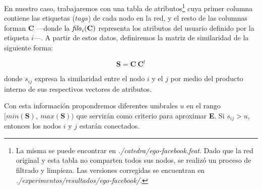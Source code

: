 
\vspace{2em}
En nuestro caso, trabajaremos con una tabla de atributos\footnote{La misma se puede encontrar en \textit{./catedra/ego-facebook.feat}. Dado que la red original y esta tabla no comparten todos sus nodos, se realizó un proceso de filtrado y limpieza. Las versiones corregidas se encuentran en \textit{./experimentos/resultados/ego-facebook/}.} cuya primer columna contiene las etiquetas ($tags$) de cada nodo en la red, y el resto de las columnas forman \textbf{C} ---donde la $\text{\textit{fila}}_i(\textbf{C})$ representa los atributos del usuario definido por la etiqueta $i$---. A partir de estos datos, definiremos la matriz de similaridad de la siguiente forma:

\vspace{1em}
\begin{equation}
    \mathbf{S} = \mathbf{C}\ \mathbf{C}^{t}
\end{equation}

\vspace{1em}
\noindent donde $s_{ij}$ expresa la similaridad entre el nodo $i$ y el $j$ por medio del producto interno de sus respectivos vectores de atributos. 

\vspace{1em}
Con esta información propondremos diferentes umbrales $u$ en el rango $[min(\mathbf{S}),\ max(\mathbf{S}))$ que servirán como criterio para aproximar \textbf{E}. Si $s_{ij} > u$, entonces los nodos $i$ y $j$ estarán conectados. 


